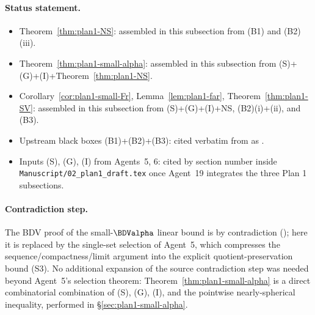 \paragraph{Status statement.}
\begin{itemize}
\item Theorem~\ref{thm:plan1-NS}: assembled in this subsection from
   (B1) and (B2)(iii).
\item Theorem~\ref{thm:plan1-small-alpha}: assembled in this subsection
   from (S)+(G)+(I)+Theorem~\ref{thm:plan1-NS}.
\item Corollary~\ref{cor:plan1-small-Fr},
   Lemma~\ref{lem:plan1-far}, Theorem~\ref{thm:plan1-SV}: assembled in
   this subsection from (S)+(G)+(I)+NS, (B2)(i)+(ii), and (B3).
\item Upstream black boxes (B1)+(B2)+(B3): cited verbatim from
   \cite{BDV} as \cite[Thm.\ 3.3, Lem.\ 4.2 (i),(ii),(iii),
   Lem.\ 5.2]{BDV}.
\item Inputs (S), (G), (I) from Agents~5, 6: cited by section number
   inside \texttt{Manuscript/02\_plan1\_draft.tex} once Agent~19
   integrates the three Plan 1 subsections.
\end{itemize}

\paragraph{Contradiction step.}
The BDV proof of the small-$\BDValpha$ linear bound is by
contradiction (\cite[Theorem 4.3]{BDV}); here it is replaced by the
single-set selection of Agent~5, which compresses the
sequence/compactness/limit argument into the explicit
quotient-preservation bound (S3). No additional expansion of the source
contradiction step was needed beyond Agent~5's selection theorem:
Theorem~\ref{thm:plan1-small-alpha} is a direct combinatorial
combination of (S), (G), (I), and the pointwise nearly-spherical
inequality, performed in \S\ref{sec:plan1-small-alpha}.
